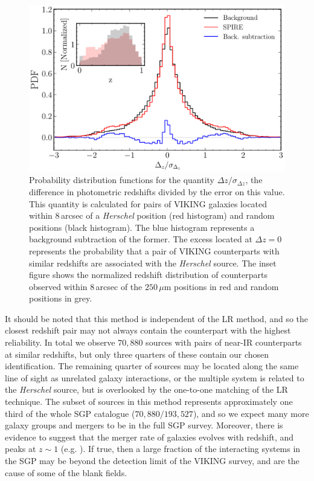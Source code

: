\begin{figure}
    \centering
    \includegraphics[width=0.8\columnwidth]{Figures/Figure_2_7.pdf}
    \caption[PDFs of $\Delta z/\sigma_{\Delta z}$ for \textit{Herschel} sources and random positions]{Probability distribution functions for the quantity $\Delta z/\sigma_{\Delta z}$, the difference in photometric redshifts divided by the error on this value. This quantity is calculated for pairs of VIKING galaxies located within $8\,$arcsec of a \textit{Herschel} position (red histogram) and random positions (black histogram). The blue histogram represents a background subtraction of the former. The excess located at $\Delta z = 0$ represents the probability that a pair of VIKING counterparts with similar redshifts are associated with the \textit{Herschel} source. The inset figure shows the normalized redshift distribution of counterparts observed within $8\,$arcsec of the $250\,\mu$m positions in red and random positions in grey.}
    \label{fig:delta_z_multiplicity}
\end{figure}

It should be noted that this method is independent of the LR method, and so the closest redshift pair may not always contain the counterpart with the highest reliability. In total we observe $70,880$ sources with pairs of near-IR counterparts at similar redshifts, but only three quarters of these contain our chosen identification. The remaining quarter of sources may be located along the same line of sight as unrelated galaxy interactions, or the multiple system is related to the \textit{Herschel} source, but is overlooked by the one-to-one matching of the LR technique. The subset of sources in this method represents approximately one third of the whole SGP catalogue ($70,880/193,527$), and so we expect many more galaxy groups and mergers to be in the full SGP survey. Moreover, there is evidence to suggest that the merger rate of galaxies evolves with redshift, and peaks at $z \sim 1$ (e.g. \citealt{Bell_2006, Ryan_2008}). If true, then a large fraction of the interacting systems in the SGP may be beyond the detection limit of the VIKING survey, and are the cause of some of the blank fields.

